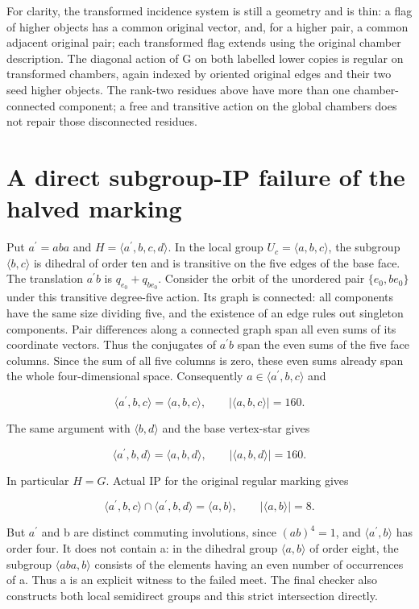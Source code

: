 For clarity, the transformed incidence system is still a geometry and is
thin: a flag of higher objects has a common original vector, and, for a
higher pair, a common adjacent original pair; each transformed flag
extends using the original chamber description. The diagonal action of G
on both labelled lower copies is regular on transformed chambers, again
indexed by oriented original edges and their two seed higher objects.
The rank-two residues above have more than one chamber-connected
component; a free and transitive action on the global chambers does not
repair those disconnected residues.

\section{A direct subgroup-IP failure of the halved
marking}\label{a-direct-subgroup-ip-failure-of-the-halved-marking}

Put \(a^{\prime}=aba\) and \(H=\langle a^{\prime},b,c,d\rangle\). In the
local group \(U_c=\langle a,b,c\rangle\), the subgroup
\(\langle b,c\rangle\) is dihedral of order ten and is transitive on the
five edges of the base face. The translation \(a^{\prime}b\) is
\(q_{e_0}+q_{be_0}\). Consider the orbit of the unordered pair
\(\{e_0,be_0\}\) under this transitive degree-five action. Its
graph is connected: all components have the same size dividing five, and
the existence of an edge rules out singleton components. Pair
differences along a connected graph span all even sums of its coordinate
vectors. Thus the conjugates of \(a^{\prime}b\) span the even sums of
the five face columns. Since the sum of all five columns is zero, these
even sums already span the whole four-dimensional space. Consequently
\(a\in\langle a^{\prime},b,c\rangle\) and

\[\langle a^{\prime},b,c\rangle=\langle a,b,c\rangle,\qquad |\langle a,b,c\rangle|=160.\]

The same argument with \(\langle b,d\rangle\) and the base vertex-star
gives

\[\langle a^{\prime},b,d\rangle=\langle a,b,d\rangle,\qquad |\langle a,b,d\rangle|=160.\]

In particular \(H=G\). Actual IP for the original regular marking gives

\[\langle a^{\prime},b,c\rangle\cap\langle a^{\prime},b,d\rangle=\langle a,b\rangle,\qquad |\langle a,b\rangle|=8.\]

But \(a^{\prime}\) and b are distinct commuting involutions, since
\((ab)^4=1\), and \(\langle a^{\prime},b\rangle\) has order four. It
does not contain a: in the dihedral group \(\langle a,b\rangle\) of
order eight, the subgroup \(\langle aba,b\rangle\) consists of the
elements having an even number of occurrences of a. Thus a is an
explicit witness to the failed meet. The final checker also constructs
both local semidirect groups and this strict intersection directly.

